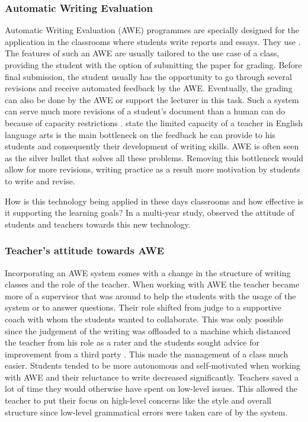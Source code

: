\documentclass[runningheads]{llncs}
\begin{document}
\subsubsection{Automatic Writing Evaluation}
Automatic Writing Evaluation (AWE) programmes are specially designed for the application in the classrooms where students write reports and essays. They use  .
The features of such an AWE are usually tailored to the use case of a class, providing the student with the option of submitting the paper for grading. Before final submission, the student usually has the opportunity to go through several revisions and receive automated feedback by the AWE. Eventually, the grading can also be done by the AWE or support the lecturer in this task. Such a system can serve much more revisions of a student's document than a human can do because of capacity restrictions \citep{warschauer_automated_2006}. \textcite{grimes_utility_2010} state the limited capacity of a teacher in English language arts is the main bottleneck on the feedback he can provide to his students and consequently their development of writing skills. AWE is often seen as the silver bullet that solves all these problems. Removing this bottleneck would allow for more revisions, writing practice as a result more motivation by students to write and revise.        

How is this technology being applied in these days classrooms and how effective is it supporting the learning goals? In a multi-year study, \textcite{grimes_utility_2010} observed the attitude of students and teachers towards this new technology. 

\subsubsection{Teacher's attitude towards AWE}
Incorporating an AWE system comes with a change in the structure of writing classes and the role of the teacher. When working with AWE the teacher became more of a supervisor that was around to help the students with the usage of the system or to answer questions. Their role shifted from judge to a supportive coach with whom the students wanted to collaborate. This was only possible since the judgement of the writing was offloaded to a machine which distanced the teacher from his role as a rater and the students sought advice for improvement from a third party \citep{grimes_utility_2010}. This made the management of a class much easier. Students tended to be more autonomous and self-motivated when working with AWE and their reluctance to write decreased significantly. Teachers saved a lot of time they would otherwise have spent on low-level issues. This allowed the teacher to put their focus on high-level concerns like the style and overall structure since low-level grammatical errors were taken care of by the system.
\end{document}
